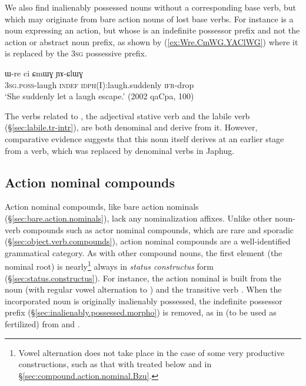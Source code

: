 We also find inalienably possessed nouns without a corresponding base verb, but which may originate from bare action nouns of lost base verbs. For instance  is a noun expressing an action, but whose  is an indefinite possessor prefix and not the action or abstract noun prefix, as shown by (\ref{ex:Wre.CmWG.YAClWG}) where it is replaced by the \textsc{3sg} possessive  prefix. 

\begin{exe}
\ex \label{ex:Wre.CmWG.YAClWG}
\gll  ɯ-re ci ɕmɯɣ ɲɤ-ɕlɯɣ \\
 \textsc{3sg}.\textsc{poss}-laugh \textsc{indef} \textsc{idph}(I):laugh.suddenly \textsc{ifr}-drop \\
\glt  `She suddenly let a laugh escape.' (2002 qaCpa, 100)
\end{exe}

The verbs related to  , the adjectival stative verb  and the labile verb  (§\ref{sec:labile.tr-intr}), are both denominal and derive from it. However, comparative evidence suggests that this noun itself derives at an earlier stage from a verb, which was replaced by denominal verbs in Japhug.


\subsection{Action nominal compounds} \label{sec:action.nominal.compounds}
Action nominal compounds, like bare action nominals (§\ref{sec:bare.action.nominals}), lack any nominalization affixes. Unlike other noun-verb compounds such as actor nominal compounds, which are rare and sporadic (§\ref{sec:object.verb.compounds}), action nominal compounds are a well-identified grammatical category. As with other compound nouns, the first element (the nominal root) is nearly\footnote{Vowel alternation does not take place in the case of some very productive constructions, such as that with  treated below and in §\ref{sec:compound.action.nominal.Bzu}.} always in \textit{status constructus} form (§\ref{sec:status.constructus}). For instance, the action nominal  is built from the noun  (with regular vowel alternation to ) and the transitive verb .  When the incorporated noun is originally inalienably possessed, the indefinite possessor prefix (§\ref{sec:inalienably.possessed.morpho}) is removed, as in  (to be used as fertilized) from  and .
 
